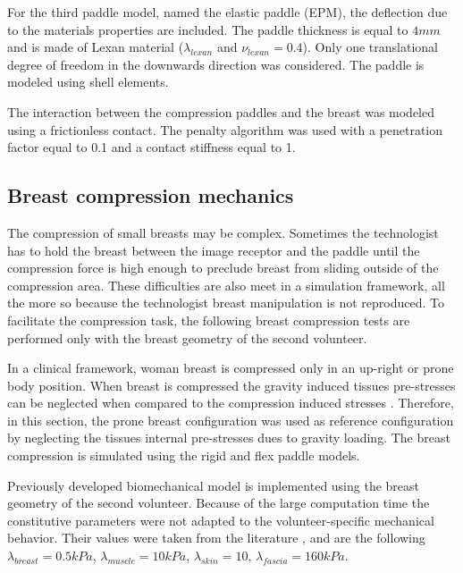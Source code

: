 For the third paddle model, named the elastic paddle (EPM), the deflection due to the materials properties are included. The paddle thickness is equal to $4mm$ and is made of Lexan material ($\lambda_{lexan}$ and $\nu_{lexan}= 0.4$).   Only one translational degree of freedom in the downwards direction was considered. The paddle is modeled using shell elements. 

The interaction between the compression paddles and the breast was modeled using a frictionless contact. The penalty algorithm was used with a penetration factor equal to 0.1 and a contact stiffness equal to 1. 
 
\subsection{Breast compression mechanics}

The compression of small breasts may be complex. Sometimes the technologist has to hold the breast between the image receptor and the paddle until the compression force is high enough to preclude breast from sliding outside of the compression area. These difficulties are also meet in a simulation framework, all the more so because the technologist breast manipulation is not reproduced. To facilitate the compression task, the following breast compression tests are performed only with the breast geometry of the second volunteer.

In a clinical framework, woman breast is compressed only in an up-right or prone body position. When breast is compressed the gravity induced tissues pre-stresses can be neglected when compared to the compression induced stresses \citep{han_development_2012, ruiter_model_based_2006, sturgeon_finite_element_2016}.  Therefore, in this section, the prone breast configuration was used as reference configuration by neglecting the tissues internal pre-stresses dues to gravity loading. The breast compression is simulated using the rigid and flex paddle models. 

Previously developed biomechanical model is implemented using the breast geometry of the second volunteer. Because of the large computation time the constitutive parameters were not adapted to the volunteer-specific mechanical behavior. Their values were taken from the literature \citep{han_nonlinear_2014,rajagopal_modelling_2007,gefen_mechanics_2007}, and are the following $\lambda_{breast}=0.5 kPa$, $\lambda_{muscle}= 10kPa$, $\lambda_{skin}=10$, $\lambda_{fascia}= 160kPa$.    

